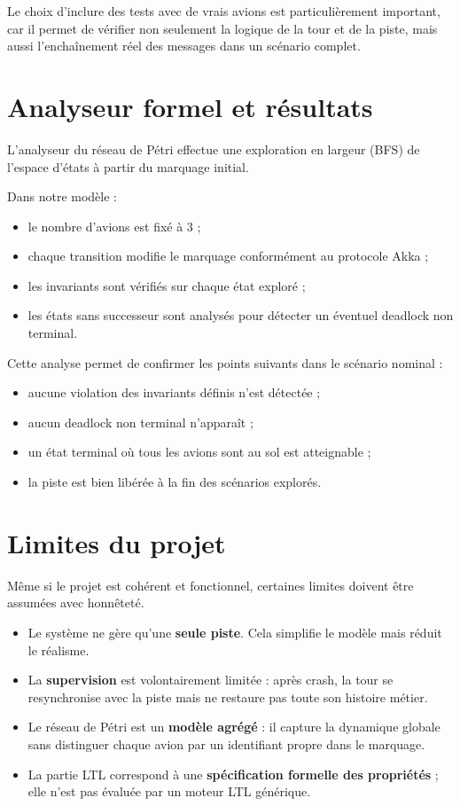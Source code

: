 \documentclass[11pt,a4paper]{article}
\begin{document}
Le choix d'inclure des tests avec de vrais avions est particulièrement important, car il permet de vérifier non seulement la logique de la tour et de la piste, mais aussi l'enchaînement réel des messages dans un scénario complet.

\section{Analyseur formel et résultats}

L'analyseur du réseau de Pétri effectue une exploration en largeur (BFS) de l'espace d'états à partir du marquage initial.

Dans notre modèle :
\begin{itemize}
    \item le nombre d'avions est fixé à 3 ;
    \item chaque transition modifie le marquage conformément au protocole Akka ;
    \item les invariants sont vérifiés sur chaque état exploré ;
    \item les états sans successeur sont analysés pour détecter un éventuel deadlock non terminal.
\end{itemize}

Cette analyse permet de confirmer les points suivants dans le scénario nominal :
\begin{itemize}
    \item aucune violation des invariants définis n'est détectée ;
    \item aucun deadlock non terminal n'apparaît ;
    \item un état terminal où tous les avions sont au sol est atteignable ;
    \item la piste est bien libérée à la fin des scénarios explorés.
\end{itemize}

\section{Limites du projet}

Même si le projet est cohérent et fonctionnel, certaines limites doivent être assumées avec honnêteté.

\begin{itemize}
    \item Le système ne gère qu'une \textbf{seule piste}. Cela simplifie le modèle mais réduit le réalisme.
    \item La \textbf{supervision} est volontairement limitée : après crash, la tour se resynchronise avec la piste mais ne restaure pas toute son histoire métier.
    \item Le réseau de Pétri est un \textbf{modèle agrégé} : il capture la dynamique globale sans distinguer chaque avion par un identifiant propre dans le marquage.
    \item La partie LTL correspond à une \textbf{spécification formelle des propriétés} ; elle n'est pas évaluée par un moteur LTL générique.
\end{itemize}
\end{document}
